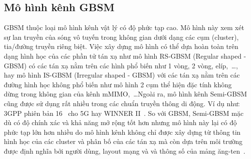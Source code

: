 
\subsection{Mô hình kênh GBSM}
\label{sec:GBSM}
GBSM thuộc loại mô hình kênh vật lý có độ phức tạp cao. Mô hình này xem xét sự lan truyền của sóng vô tuyến trong không gian dưới dạng các cụm (cluster), tia/đường truyền riêng biệt. Việc xây dựng mô hình có thể dựa hoàn toàn trên dạng hình học của các phần tử tán xạ như mô hình RS-GBSM (Regular shaped - GBSM) có các tán xạ nằm trên các hình phổ biến như 1 vòng, 2 vòng, elíp,~\ldots, hay mô hình IS-GBSM (Irregular shaped - GBSM) với các tán xạ nằm trên các đường hình học không phổ biến như mô hình 2 cụm thể hiện đặc tính không dừng trong không gian của kênh mMIMO,~\ldots Ngoài ra, mô hình kênh Semi-GBSM cũng được sử dụng rất nhiều trong các chuẩn truyền thông di động. Ví dụ như: 3GPP phiên bản 16~\cite{r16} cho 5G hay WINNER II~\cite{WINNER}. So với GBSM, Semi-GBSM mặc dù có độ chính xác và khả năng mở rộng tốt hơn nhưng mô hình này lại có độ phức tạp lớn hơn nhiều do mô hình kênh không chỉ được xây dựng từ thông tin hình học của các cluster và phân bố của các tán xạ mà còn dựa trên môi trường được định nghĩa bởi người dùng, layout mạng và và thông số của mảng ăng-ten~\cite{Zhu2022}.

